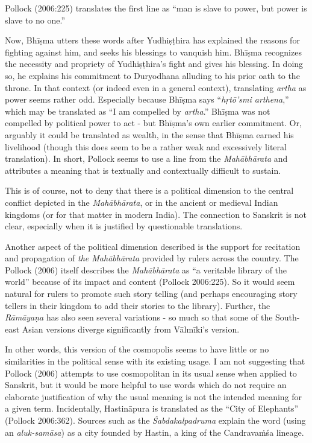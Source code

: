 Pollock (2006:225) translates the first line as “man is slave to power, but power is slave to no one.”

Now, Bhīṣma utters these words after Yudhiṣṭhira has explained the reasons for fighting against him, and seeks his blessings to vanquish him. Bhīṣma recognizes the necessity and propriety of Yudhiṣṭhira’s fight and gives his blessing. In doing so, he explains his commitment to Duryodhana alluding to his prior oath to the throne. In that context (or indeed even in a general context), translating {\sl artha} as power seems rather odd. Especially because Bhīṣma says “{\sl hṛtō'smi arthena},” which may be translated as “I am compelled by {\sl artha}.” Bhīṣma was not compelled by political power to act - but Bhīṣma's own earlier commitment. Or, arguably it could be translated as wealth, in the sense that Bhīṣma earned his livelihood (though this does seem to be a rather weak and excessively literal translation). In short, Pollock seems to use a line from the {\sl Mahābhārata} and attributes a meaning that is textually and contextually difficult to sustain.

This is of course, not to deny that there is a political dimension to the central conflict depicted in the {\sl Mahābhārata}, or in the ancient or medieval Indian kingdoms (or for that matter in modern India). The connection to Sanskrit is not clear, especially when it is justified by questionable translations.

Another aspect of the political dimension described is the support for recitation and propagation of {\sl the Mahābhārata} provided by rulers across the country. The Pollock (2006) itself describes the {\sl Mahābhārata} as “a veritable library of the world” because of its impact and content (Pollock 2006:225). So it would seem natural for rulers to promote such story telling (and perhaps encouraging story tellers in their kingdom to add their stories to the library).  Further, the {\sl Rāmāyaṇa} has also seen several variations - so much so that some of the South-east Asian versions diverge significantly from Vālmīki’s version. 

In other words, this version of the cosmopolis seems to have little or no similarities in the political sense with its existing usage. I am not suggesting that Pollock (2006) attempts to use cosmopolitan in its usual sense when applied to Sanskrit, but it would be more helpful to use words which do not require an elaborate justification of why the usual meaning is not the intended meaning for a given term. Incidentally, Hastināpura is translated as the “City of Elephants” (Pollock 2006:362). Sources such as the {\sl Śabdakalpadruma} explain the word (using an {\sl aluk-samāsa}) as a city founded by Hastin, a king of the Candravaṁśa lineage.

